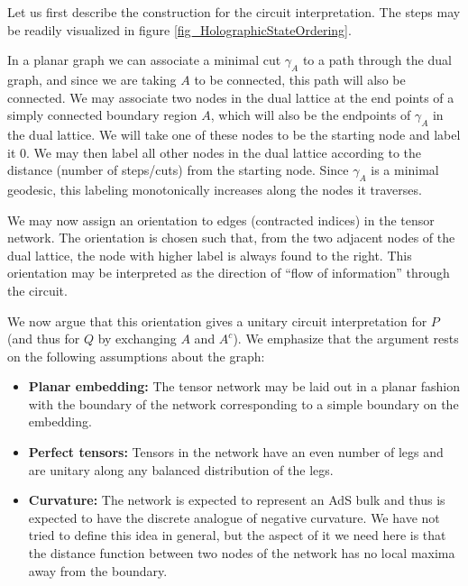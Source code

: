 \documentclass[12pt]{article}
\theoremstyle{plain}
\theoremstyle{plain}
\theoremstyle{plain}
\theoremstyle{plain}
\theoremstyle{result}
\theoremstyle{remark}
\theoremstyle{conjecture}
\theoremstyle{observation}
\theoremstyle{definition}
\theoremstyle{corollary}
\theoremstyle{definition}
\theoremstyle{definition}
\theoremstyle{assumption}
\theoremstyle{definition}
\theoremstyle{problem}
\theoremstyle{fact}
\begin{document}
Let us first describe the construction for the circuit interpretation.
The steps may be readily visualized in figure \ref{fig_HolographicStateOrdering}.  

In a planar graph we can associate a minimal cut $\gamma_A$ to a path through the dual graph, and since we are taking $A$ to be connected, this path will also be connected.  We may associate two nodes in the dual lattice at the end points of a simply connected boundary region $A$, which will also be the endpoints of $\gamma_A$ in the dual lattice.  We will take one of these nodes to be the starting node and label it $0$.  We may then label all other nodes in the dual lattice according to the distance (number of steps/cuts) from the starting node.
Since $\gamma_A$ is a minimal geodesic, this labeling monotonically increases along the nodes it traverses.

We may now assign an orientation to edges (contracted indices) in the tensor network.
The orientation is chosen such that, from the two adjacent nodes of the dual lattice, the node with higher label is always found to the right.
This orientation may be interpreted as the direction of ``flow of information'' through the circuit.
 
We now argue that this orientation gives a unitary circuit interpretation for $P$ (and thus for $Q$ by exchanging $A$ and $A^c$).  We emphasize that the argument rests on the following assumptions about the graph:
\begin{itemize}
\item {\bf Planar embedding:} The tensor network may be laid out in a planar fashion with the boundary of the network corresponding to a simple boundary on the embedding.
\item {\bf Perfect tensors:} Tensors in the network have an even number of legs and are unitary along any balanced distribution of the legs.
\item {\bf Curvature: } The network is expected to represent an AdS bulk and thus is expected to have the discrete analogue of negative curvature.  We have not tried to define this idea in general, but the aspect of it we need here is that the distance function between two nodes of the network has no local maxima away from the boundary.  
\end{itemize}
\end{document}
